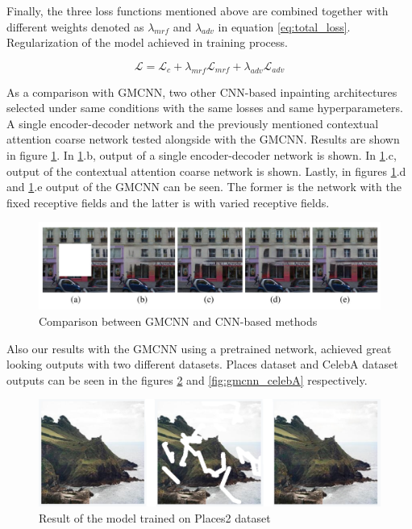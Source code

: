 Finally, the three loss functions mentioned above are combined together with different weights denoted as \(\lambda_{mrf}\) and \(\lambda_{adv}\) in equation \ref{eq:total_loss}. Regularization of the model achieved in training process.

\begin{equation}
    \mathcal{L} = \mathcal{L}_{c} + \lambda_{mrf} \mathcal{L}_{mrf} + \lambda_{adv} \mathcal{L}_{adv}
    \label{eq:total_loss}
\end{equation}

As a comparison with GMCNN, two other CNN-based inpainting architectures selected under same conditions with the same losses and same hyperparameters. A single encoder-decoder network and the previously mentioned contextual attention coarse network \cite{generative_contextual} tested alongside with the GMCNN. Results are shown in figure \ref{fig:gmcnn_paris_comparison}. In \ref{fig:gmcnn_paris_comparison}.b, output of a single encoder-decoder network is shown. In \ref{fig:gmcnn_paris_comparison}.c, output of the contextual attention
coarse network is shown. Lastly, in figures \ref{fig:gmcnn_paris_comparison}.d and \ref{fig:gmcnn_paris_comparison}.e output of the GMCNN can be seen. The former is the network with the fixed receptive fields and the latter is with varied receptive fields.

\begin{figure}[h!]
    \centering
    \includegraphics[width=14cm]{figures/chapter4/gmcnn_paris_comparison.png}
    \caption{Comparison between GMCNN and CNN-based methods \cite{inpainting_via_multi_cnn}}
    \label{fig:gmcnn_paris_comparison}
\end{figure}

Also our results with the GMCNN using a pretrained network, achieved great looking outputs with two different datasets. Places \cite{dataset_places} dataset and CelebA \cite{celebA} dataset outputs can be seen in the figures \ref{fig:gmcnn_places2} and \ref{fig:gmcnn_celebA} respectively.

\begin{figure}[h!]
    \centering
    \includegraphics[width=14cm]{figures/chapter4/gmcnnout2.png}
    \vspace*{3mm}
    \caption{Result of the model trained on Places2 dataset}
    \label{fig:gmcnn_places2}
\end{figure}

